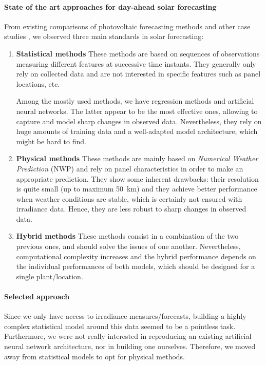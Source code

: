 \documentclass[a4paper, 12pt]{article}
\begin{document}
\paragraph{State of the art approaches for day-ahead solar forecasting}
From existing comparisons of photovoltaic forecasting methods \parencite{nespoli2019day} and other case studies \parencite{bocquet2016assessment}, we observed three main standards in solar forecasting:

\begin{enumerate}[label=\arabic*]
    \item \textbf{Statistical methods} These methods are based on sequences of observations measuring different features at successive time instants. They generally only rely on collected data and are not interested in specific features such as panel locations, etc.
    
    Among the mostly used methods, we have regression methods and artificial neural networks. The latter appear to be the most effective ones, allowing to capture and model sharp changes in observed data. Nevertheless, they rely on huge amounts of training data and a well-adapted model architecture, which might be hard to find.
    
    \item \textbf{Physical methods} These methods are mainly based on \emph{Numerical Weather Prediction} (NWP) and rely on panel characteristics in order to make an appropriate prediction. They show some inherent drawbacks: their resolution is quite small (up to maximum \SI{50}{\kilo\meter}) and they achieve better performance when weather conditions are stable, which is certainly not ensured with irradiance data. Hence, they are less robust to sharp changes in observed data.
    
    \item \textbf{Hybrid methods} These methods consist in a combination of the two previous ones, and should solve the issues of one another. Nevertheless, computational complexity increases and the hybrid performance depends on the individual performances of both models, which should be designed for a single plant/location.
\end{enumerate}

\paragraph{Selected approach}
Since we only have access to irradiance measures/forecasts, building a highly complex statistical model around this data seemed to be a pointless task. Furthermore, we were not really interested in reproducing an existing artificial neural network architecture, nor in building one ourselves. Therefore, we moved away from statistical models to opt for physical methods.
\end{document}
